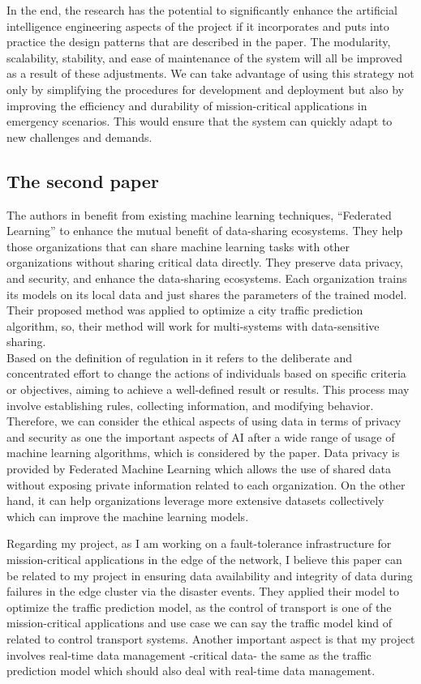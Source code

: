 \documentclass{article}
\begin{document}
In the end, the research has the potential to significantly enhance the artificial intelligence engineering aspects of the project if it incorporates and puts into practice the design patterns that are described in the paper. The modularity, scalability, stability, and ease of maintenance of the system will all be improved as a result of these adjustments. We can take advantage of using this strategy not only by simplifying the procedures for development and deployment but also by improving the efficiency and durability of mission-critical applications in emergency scenarios. This would ensure that the system can quickly adapt to new challenges and demands.


\subsection{The second paper}
The authors in \cite{10164748} benefit from existing machine learning techniques, ``Federated Learning'' to enhance the mutual benefit of data-sharing ecosystems. They help those organizations that can share machine learning tasks with other organizations without sharing critical data directly. They preserve data privacy, and security, and enhance the data-sharing ecosystems. Each organization trains its models on its local data and just shares the parameters of the trained model. Their proposed method was applied to optimize a city traffic prediction algorithm, so, their method will work for multi-systems with data-sensitive sharing. \\
Based on the definition of regulation in \cite{hildebrandt2018algorithmic}  it refers to the deliberate and concentrated effort to change the actions of individuals based on specific criteria or objectives, aiming to achieve a well-defined result or results. This process may involve establishing rules, collecting information, and modifying behavior. Therefore, we can consider the ethical aspects of using data in terms of privacy and security as one the important aspects of AI after a wide range of usage of machine learning algorithms, which is considered by the paper. Data privacy is provided by Federated Machine Learning which allows the use of shared data without exposing private information related to each organization. On the other hand, it can help organizations leverage more extensive datasets collectively which can improve the machine learning models.

Regarding my project, as I am working on a fault-tolerance infrastructure for mission-critical applications in the edge of the network, I believe this paper can be related to my project in ensuring data availability and integrity of data during failures in the edge cluster via the disaster events. They applied their model to optimize the traffic prediction model, as the control of transport is one of the mission-critical applications and use case we can say the traffic model kind of related to control transport systems. Another important aspect is that my project involves real-time data management -critical data- the same as the traffic prediction model which should also deal with real-time data management. 
\end{document}
